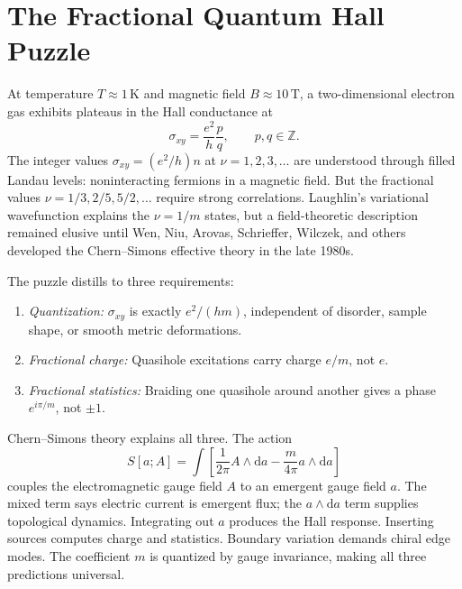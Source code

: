 
\providecommand{\dd}{\mathrm{d}}
\providecommand{\Tr}{\operatorname{Tr}}
\providecommand{\tr}{\operatorname{tr}}
\providecommand{\CS}{\operatorname{CS}}
\providecommand{\Hom}{\operatorname{Hom}}
\providecommand{\U}{\operatorname{U}}
\providecommand{\SU}{\operatorname{SU}}
\providecommand{\Lk}{\operatorname{Lk}}

\section{The Fractional Quantum Hall Puzzle}
\label{sec:fqhe-throughline}

At temperature $T\approx 1\,\text{K}$ and magnetic field $B\approx 10\,\text{T}$, a two-dimensional electron gas exhibits plateaus in the Hall conductance at
\begin{equation}
  \sigma_{xy}
  =
  \frac{e^2}{h}\frac{p}{q},
  \qquad
  p,q\in\mathbb Z.
  \label{eq:fqhe-conductance}
\end{equation}
The integer values $\sigma_{xy}=(e^2/h)n$ at $\nu=1,2,3,\ldots$ are understood through filled Landau levels: noninteracting fermions in a magnetic field. But the fractional values $\nu=1/3,2/5,5/2,\ldots$ require strong correlations. Laughlin's variational wavefunction explains the $\nu=1/m$ states, but a field-theoretic description remained elusive until Wen, Niu, Arovas, Schrieffer, Wilczek, and others developed the Chern--Simons effective theory in the late 1980s.

The puzzle distills to three requirements:

\begin{enumerate}
  \item \emph{Quantization:} $\sigma_{xy}$ is exactly $e^2/(hm)$, independent of disorder, sample shape, or smooth metric deformations.
  \item \emph{Fractional charge:} Quasihole excitations carry charge $e/m$, not $e$.
  \item \emph{Fractional statistics:} Braiding one quasihole around another gives a phase $e^{i\pi/m}$, not $\pm 1$.
\end{enumerate}

Chern--Simons theory explains all three. The action
\begin{equation}
  S[a;A]
  =
  \int\left[
  \frac{1}{2\pi}A\wedge\dd a
  -
  \frac{m}{4\pi}a\wedge\dd a
  \right]
  \label{eq:fqhe-action}
\end{equation}
couples the electromagnetic gauge field $A$ to an emergent gauge field $a$. The mixed term says electric current is emergent flux; the $a\wedge\dd a$ term supplies topological dynamics. Integrating out $a$ produces the Hall response. Inserting sources computes charge and statistics. Boundary variation demands chiral edge modes. The coefficient $m$ is quantized by gauge invariance, making all three predictions universal.

